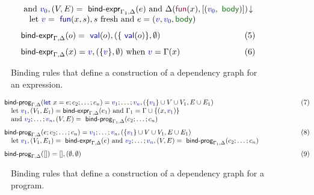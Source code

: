 \documentclass[english,submission]{programming}
\theoremstyle{plain}
\theoremstyle{definition}
\newcommand{\ident}[1]{\textnormal{\textcolor{idclr}{\sffamily #1}}}
\newcommand{\kvd}[1]{\textnormal{\textcolor{kvdclr}{\sffamily #1}}}
\newcommand{\bndclr}[1]{\textcolor{kvdclr}{#1}}
\newcommand{\bnd}[1]{\textnormal{\textcolor{kvdclr}{\sffamily #1}}}
\newcommand{\bknd}[1]{\textnormal{\textcolor{prepclr}{\sffamily #1}}}
\newcommand{\blbl}[1]{\textnormal{\textcolor{numclr}{\sffamily #1}}}
\begin{document}
\begin{figure}[t]
\begin{equation*}
\begin{array}{ll}
~\textnormal{and}~\bndclr{v_0}, (V, E) = \ident{bind-expr}_{\Gamma_1, \Delta}(e)
~\textnormal{and}~\Delta(\bknd{fun}(x),[(\bndclr{v_0}, \blbl{body})])\!\downarrow\\
\quad \textnormal{let}~\bndclr{v} = \bnd{fun}(x, s), s~\textnormal{fresh}
~\textnormal{and}~e = (\bndclr{v},\bndclr{v_0},\blbl{body})
\\[0.75em]
\ident{bind-expr}_{\Gamma, \Delta}(o) = \bnd{val}(o), (\{ \bnd{val}(o) \}, \emptyset) &\hspace{-2em}(5)
\\[0.75em]
\ident{bind-expr}_{\Gamma, \Delta}(x) = \bndclr{v}, (\{ \bndclr{v} \}, \emptyset)~\textnormal{when}~\bndclr{v} = \Gamma(x)&\hspace{-2em}(6)
\end{array}
\end{equation*}
\vspace{-1em}
\caption{Binding rules that define a construction of a dependency graph for an expression.}
\label{fig:binding-rules-expr}
\end{figure}


\begin{figure}[t]
\begin{equation*}
\vspace{-0.5em}
\hspace{-1.5em}
\begin{array}{ll}
\ident{bind-prog}_{\Gamma, \Delta}(\kvd{let}~x=e; c_2; \ldots; c_n) = \bndclr{v_1};\ldots;\bndclr{v_n}, (\{\bndclr{v_1}\} \cup V \cup V_1, E \cup E_1)
  \hspace{9.35em}&\hspace{2.5em}(7)\\
\quad \textnormal{let}~\bndclr{v_1}, (V_1,E_1) = \ident{bind-expr}_{\Gamma,\Delta}(e_1)~\textnormal{and}~\Gamma_1 = \Gamma \cup \{(x,\bndclr{v_1})\} \\
\quad \textnormal{and}~\bndclr{v_2}; \ldots; \bndclr{v_n}, (V, E) = \ident{bind-prog}_{\Gamma_1, \Delta}(c_2; \ldots; c_n)
\\[0.75em]
\ident{bind-prog}_{\Gamma, \Delta}(e; c_2; \ldots; c_n) = \bndclr{v_1};\ldots;\bndclr{v_n}, (\{\bndclr{v_1}\} \cup V \cup V_1, E \cup E_1)&\hspace{2.5em}(8)\\
\quad \textnormal{let}~\bndclr{v_1}, (V_1,E_1) = \ident{bind-expr}_{\Gamma,\Delta}(e)
~\textnormal{and}~\bndclr{v_2}; \ldots; \bndclr{v_n}, (V, E) = \ident{bind-prog}_{\Gamma_1, \Delta}(c_2; \ldots; c_n)
\\[0.75em]
\ident{bind-prog}_{\Gamma, \Delta}([]) = [], (\emptyset, \emptyset)&\hspace{2.5em}(9)
\end{array}
\end{equation*}
\vspace{-1em}
\caption{Binding rules that define a construction of a dependency graph for a program.}
\label{fig:binding-rules-prog}
\vspace{-0.5em}
\end{figure}
\end{document}
